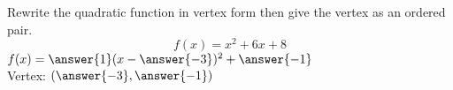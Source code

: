 \documentclass{ximera}
\author{David Kish}
\begin{document}
\begin{exercise}
Rewrite the quadratic function in vertex form then give the vertex as an ordered pair.
\[
f(x)=x^2+6x+8
\]
$f(x) = \answer{1}(x-\answer{-3})^2+\answer{-1} $\\
Vertex: $(\answer{-3},\answer{-1})$
\end{exercise}
\end{document}
